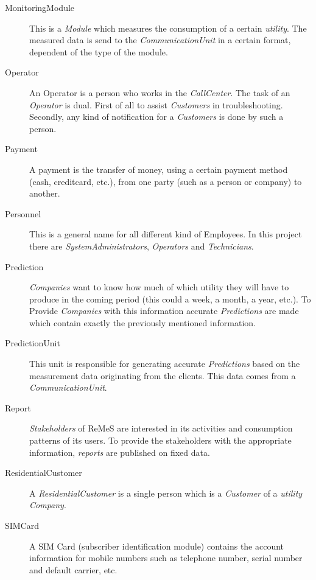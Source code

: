 \begin{description}
\item[MonitoringModule] This is a \emph{Module} which measures the consumption
of a certain \emph{utility}. The measured data is send to the
\emph{CommunicationUnit} in a certain format, dependent of the type of the
module.

\item[Operator] An Operator is a person who works in the \emph{CallCenter}. The
task of an \emph{Operator} is dual. First of all to assist \emph{Customers} in
troubleshooting. Secondly, any kind of notification for a \emph{Customers} is
done by such a person.

\item[Payment] A payment is the transfer of money, using a certain payment
method (cash, creditcard, etc.), from one party (such as a person or company) to
another.

\item[Personnel] This is a general name for all different kind of Employees. In
this project there are \emph{SystemAdministrators}, \emph{Operators} and
\emph{Technicians}.

\item[Prediction] \emph{Companies} want to know how much of which utility they
will have to produce in the coming period (this could a week, a month, a year,
etc.). To Provide \emph{Companies} with this information accurate
\emph{Predictions} are made which contain exactly the previously mentioned
information.

\item[PredictionUnit] This unit is responsible for generating accurate
\emph{Predictions} based on the measurement data originating from the clients.
This data comes from a \emph{CommunicationUnit}.

\item[Report] \emph{Stakeholders} of ReMeS are interested in its activities and
consumption patterns of its users. To provide the stakeholders with the
appropriate information, \emph{reports} are published on fixed data.

\item[ResidentialCustomer] A \emph{ResidentialCustomer} is a single person which
is a \emph{Customer} of a \emph{utility} \emph{Company}. 

\item[SIMCard] A SIM Card (subscriber identification module) contains the
account information for mobile numbers such as telephone number, serial number
and default carrier, etc.


\end{description}
